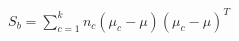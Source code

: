 \documentclass[preview]{standalone}
\begin{document}
\begin{align*}
S_b = \sum_{c=1}^k n_c (\mu_c - \mu)(\mu_c - \mu)^T
\end{align*}
\end{document}
